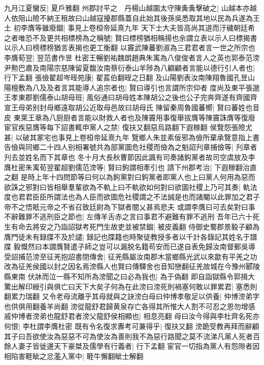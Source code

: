 九月江夏蠻反|{
	夏戶雅翻}
州郡討平之　丹楊山越圍太守陳夤夤擊破之|{
	山越本亦越人依阻山險不納王租故曰山越寇擾郡縣蓋自此始其後孫吳悉取其地以民為兵遂為王土}
初李膺等雖廢錮|{
	事見上卷桓帝延熹九年}
天下士大夫皆高尚其道而汙穢朝廷希之者唯恐不及更共相標榜為之稱號|{
	賢曰標榜猶相稱揚也余謂立表以示人曰標揭書以示人曰榜標榜猶言表揭也更工衡翻}
以竇武陳蕃劉淑為三君君者言一世之所宗也李膺荀翌|{
	翌范書作昱}
杜密王暢劉祐魏朗趙典朱㝢為八俊俊者言人之英也郭泰范滂尹勲巴肅及南陽宗慈陳留夏馥汝南蔡衍泰山羊陟為八顧顧者言能以德行引人者也|{
	行下孟翻}
張儉翟超岑晊苑康|{
	翟萇伯翻晊之日翻}
及山陽劉表汝南陳翔魯國孔昱山陽檀敷為八及及者言其能導人追宗者也|{
	賢曰導引也言謂所宗仰者}
度尚及東平張邈王孝東郡劉儒泰山胡母班|{
	風俗通曰胡母姓本陳胡公之後也公子完奔齊遂有齊國齊宣王母弟别封母鄉遠取胡公近取母邑故曰胡母氏}
陳留秦周魯國蕃嚮|{
	賢曰蕃姓也音皮}
東萊王章為八厨厨者言能以財救人者也及陳竇用事復舉拔膺等陳竇誅膺等復廢宦官疾惡膺等每下詔書輒申黨人之禁|{
	復扶又翻惡烏路翻下遐稼翻}
侯覽怨張險尤甚|{
	以破其冢宅也事見上卷桓帝延熹九年}
覽鄉人朱並素佞邪為儉所棄承覽意指上書告儉與同鄉二十四人别相署號共為部黨圖危社稷而儉為之魁詔刋章捕儉等|{
	刋章者刋去並姓名而下其章也}
冬十月大長秋曹節因此諷有司奏諸鉤黨者故司空虞放及李膺杜密朱㝢荀翌翟超劉儒范滂等|{
	賢曰鉤謂相牽引也}
請下州郡考治|{
	下遐稼翻治直之翻}
是時上年十四問節等曰何以為鉤黨對曰鉤黨者即黨人也上曰黨人何用為惡而欲誅之邪對曰皆相舉羣輩欲為不軌上曰不軌欲如何對曰欲圖社稷上乃可其奏|{
	軌法度也君君臣臣所謂法也為人臣而欲圖危社稷謂之不法誠是也而諸閹以此罪加之君子帝不之悟眂元帝之不省召致廷尉為下獄者闇乂甚焉悲夫}
或謂李膺曰可去矣對曰事不辭難罪不逃刑臣之節也|{
	左傳羊舌赤之言曰事君不避難有罪不逃刑}
吾年已六十死生有命去將安之乃詣詔獄考死門生故吏並被禁錮|{
	被皮義翻}
侍御史蜀郡景毅子顧為膺門徒未有録牒不及於譴|{
	録記也牒籍也時聚徒教授多者以千計各錄記其姓名于譜牒}
毅慨然曰本謂膺賢遣子師之豈可以漏脱名籍苟安而已遂自表免歸汝南督郵吳導受詔捕范滂至征羌抱詔書閉傳舍|{
	征羌縣屬汝南郡木當鄉縣光武以來歙有平羌之功改為征羌侯國以封之因名焉滂縣人也賢曰傳驛舍也音知戀翻征羌故城在今豫州郾陵縣東南}
伏牀而泣一縣不知所為滂聞之曰必為我也|{
	為于偽翻}
即自詣獄縣令郭揖大驚出解印綬引與俱亡曰天下大矣子何為在此滂曰滂死則禍塞何敢以罪累君|{
	塞悉則翻累力瑞翻}
又令老母流離乎其母就與之訣滂白母曰仲博孝敬足以供養|{
	仲博滂弟字也供俱用翻養羊尚翻}
滂從龍舒君歸黄泉存亡各得其所惟大人割不可忍之恩勿增感戚仲博者滂弟也龍舒君者滂父龍舒侯相顯也|{
	相息亮翻}
母曰汝今得與李杜齊名死亦何恨|{
	李杜謂李膺杜密}
既有令名復求夀考可兼得乎|{
	復扶又翻}
滂跪受教再拜而辭顧其子曰吾欲使汝為惡惡不可為使汝為善則我不為惡行路聞之莫不流涕凡黨人死者百餘人妻子皆徙邊天下豪桀及儒學有行義者|{
	行下孟翻}
宦官一切指為黨人有怨隙者因相陷害睚眦之忿濫入黨中|{
	睚牛懈翻眦士解翻}
